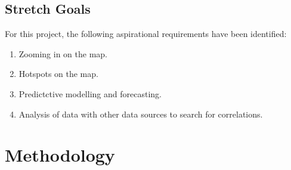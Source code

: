 \documentclass{report}
\begin{document}
\section{Stretch Goals}
For this project, the following aspirational requirements have been identified:
\begin{enumerate}
    \item Zooming in on the map.
    \item Hotspots on the map.
    \item Predictctive modelling and forecasting.
    \item Analysis of data with other data sources to search for correlations.
\end{enumerate}
\newpage

\chapter{Methodology}
\end{document}
